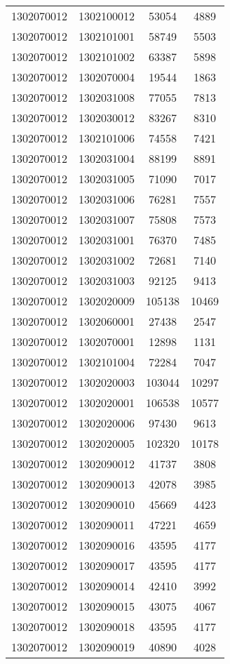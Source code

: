 \begin{longtable}[h]{llcc}
		1302070012 & 1302100012 & 53054 & 4889\\
		1302070012 & 1302101001 & 58749 & 5503\\
		1302070012 & 1302101002 & 63387 & 5898\\
		1302070012 & 1302070004 & 19544 & 1863\\
		1302070012 & 1302031008 & 77055 & 7813\\
		1302070012 & 1302030012 & 83267 & 8310\\
		1302070012 & 1302101006 & 74558 & 7421\\
		1302070012 & 1302031004 & 88199 & 8891\\
		1302070012 & 1302031005 & 71090 & 7017\\
		1302070012 & 1302031006 & 76281 & 7557\\
		1302070012 & 1302031007 & 75808 & 7573\\
		1302070012 & 1302031001 & 76370 & 7485\\
		1302070012 & 1302031002 & 72681 & 7140\\
		1302070012 & 1302031003 & 92125 & 9413\\
		1302070012 & 1302020009 & 105138 & 10469\\
		1302070012 & 1302060001 & 27438 & 2547\\
		1302070012 & 1302070001 & 12898 & 1131\\
		1302070012 & 1302101004 & 72284 & 7047\\
		1302070012 & 1302020003 & 103044 & 10297\\
		1302070012 & 1302020001 & 106538 & 10577\\
		1302070012 & 1302020006 & 97430 & 9613\\
		1302070012 & 1302020005 & 102320 & 10178\\
		1302070012 & 1302090012 & 41737 & 3808\\
		1302070012 & 1302090013 & 42078 & 3985\\
		1302070012 & 1302090010 & 45669 & 4423\\
		1302070012 & 1302090011 & 47221 & 4659\\
		1302070012 & 1302090016 & 43595 & 4177\\
		1302070012 & 1302090017 & 43595 & 4177\\
		1302070012 & 1302090014 & 42410 & 3992\\
		1302070012 & 1302090015 & 43075 & 4067\\
		1302070012 & 1302090018 & 43595 & 4177\\
		1302070012 & 1302090019 & 40890 & 4028\\

\end{longtable}
